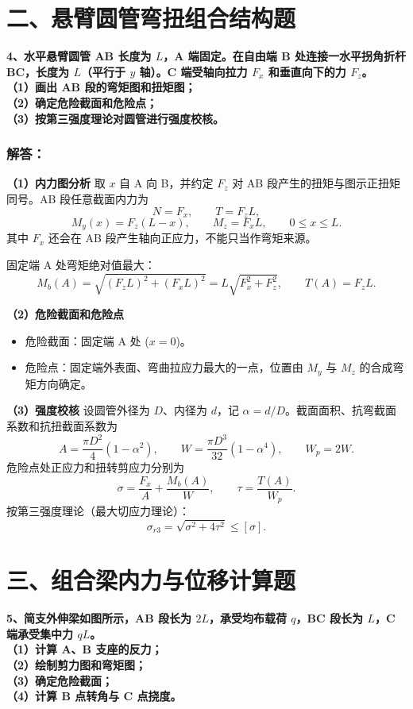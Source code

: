 \documentclass[11pt,a4paper]{ctexrep}
\begin{document}
{%


\section*{二、悬臂圆管弯扭组合结构题}

\textbf{4、水平悬臂圆管 AB 长度为 $L$，A 端固定。在自由端 B 处连接一水平拐角折杆 BC，长度为 $L$（平行于 $y$ 轴）。C 端受轴向拉力 $F_x$ 和垂直向下的力 $F_z$。\\
（1）画出 AB 段的弯矩图和扭矩图；\\
（2）确定危险截面和危险点；\\
（3）按第三强度理论对圆管进行强度校核。}

\subsubsection*{解答：}
\textbf{（1）内力图分析}
取 $x$ 自 A 向 B，并约定 $F_z$ 对 AB 段产生的扭矩与图示正扭矩同号。AB 段任意截面内力为
\[
    N=F_x,\qquad T=F_zL,
\]
\[
    M_y(x)=F_z(L-x),\qquad M_z=F_xL,\qquad 0\le x\le L.
\]
其中 $F_x$ 还会在 AB 段产生轴向正应力，不能只当作弯矩来源。

固定端 A 处弯矩绝对值最大：
\[
    M_b(A)=\sqrt{(F_zL)^2+(F_xL)^2}=L\sqrt{F_x^2+F_z^2},
    \qquad T(A)=F_zL.
\]

\textbf{（2）危险截面和危险点}
\begin{itemize}
    \item 危险截面：固定端 A 处 ($x=0$)。
    \item 危险点：固定端外表面、弯曲拉应力最大的一点，位置由 $M_y$ 与 $M_z$ 的合成弯矩方向确定。
\end{itemize}

\textbf{（3）强度校核}
设圆管外径为 $D$、内径为 $d$，记 $\alpha=d/D$。截面面积、抗弯截面系数和抗扭截面系数为
\[
    A=\frac{\pi D^2}{4}(1-\alpha^2),\qquad
    W=\frac{\pi D^3}{32}(1-\alpha^4),\qquad
    W_p=2W.
\]
危险点处正应力和扭转剪应力分别为
\[
    \sigma=\frac{F_x}{A}+\frac{M_b(A)}{W},\qquad
    \tau=\frac{T(A)}{W_p}.
\]
按第三强度理论（最大切应力理论）：
\[
    \sigma_{r3}=\sqrt{\sigma^2+4\tau^2}\le[\sigma]
    .
\]




\section*{三、组合梁内力与位移计算题}

\textbf{5、简支外伸梁如图所示，AB 段长为 $2L$，承受均布载荷 $q$，BC 段长为 $L$，C 端承受集中力 $q L$。\\
（1）计算 A、B 支座的反力；\\
（2）绘制剪力图和弯矩图；\\
（3）确定危险截面；\\
（4）计算 B 点转角与 C 点挠度。}

}
\end{document}
